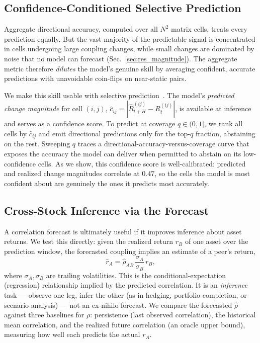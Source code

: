 \documentclass[runningheads]{llncs}
\begin{document}
\subsection{Confidence-Conditioned Selective Prediction}
\label{sec:selective}

Aggregate directional accuracy, computed over all $N^2$ matrix cells,
treats every prediction equally. But the vast majority of the
predictable signal is concentrated in cells undergoing large coupling
changes, while small changes are dominated by noise that no model can
forecast (Sec.~\ref{sec:res_magnitude}). The aggregate metric therefore
\emph{dilutes} the model's genuine skill by averaging confident,
accurate predictions with unavoidable coin-flips on near-static pairs.

We make this skill usable with selective
prediction~\cite{geifman2017selective}. The model's
\emph{predicted change magnitude} for cell $(i,j)$,
$\hat{c}_{ij} = |\hat{R}^{(ij)}_{t+H} - R^{(ij)}_t|$, is available at
inference and serves as a confidence score. To predict at coverage
$q \in (0,1]$, we rank all cells by $\hat{c}_{ij}$ and emit directional
predictions only for the top-$q$ fraction, abstaining on the rest.
Sweeping $q$ traces a directional-accuracy-versus-coverage curve that
exposes the accuracy the model can deliver when permitted to abstain on
its low-confidence cells. As we show, this confidence score is
well-calibrated: predicted and realized change magnitudes correlate at
$0.47$, so the cells the model is most confident about are genuinely the
ones it predicts most accurately.

\subsection{Cross-Stock Inference via the Forecast}
\label{sec:crossstock}

A correlation forecast is ultimately useful if it improves inference
about asset returns. We test this directly: given the realized return
$r_B$ of one asset over the prediction window, the forecasted coupling
implies an estimate of a peer's return,
\begin{equation}
    \hat{r}_A = \hat{\rho}_{AB}\,\frac{\sigma_A}{\sigma_B}\, r_B,
\end{equation}
where $\sigma_A,\sigma_B$ are trailing volatilities. This is the
conditional-expectation (regression) relationship implied by the
predicted correlation. It is an \emph{inference} task --- observe one
leg, infer the other (as in hedging, portfolio completion, or scenario
analysis) --- not an ex-nihilo forecast. We compare the forecasted
$\hat{\rho}$ against three baselines for $\rho$: persistence (last
observed correlation), the historical mean correlation, and the
realized future correlation (an oracle upper bound), measuring how well
each predicts the actual $r_A$.
\end{document}
